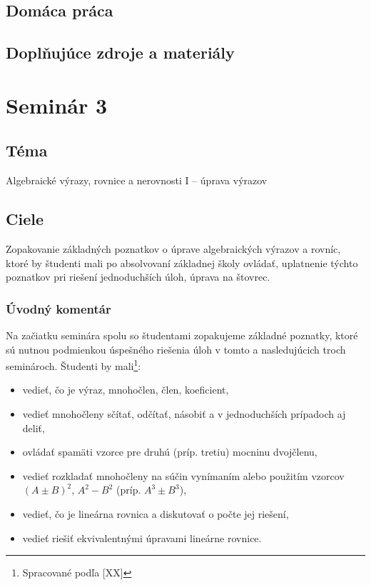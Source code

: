 \documentclass[11pt,a4paper,oneside,final]{book}
\begin{document}
\subsection*{Domáca práca}

\subsection*{Doplňujúce zdroje a materiály}
\newpage
\section*{Seminár 3}
\subsection*{Téma}
Algebraické výrazy, rovnice a nerovnosti I -- úprava výrazov

\subsection*{Ciele}
Zopakovanie základných poznatkov o úprave algebraických výrazov a rovníc, ktoré by študenti mali po absolvovaní základnej školy ovládať, uplatnenie týchto poznatkov pri riešení jednoduchších úloh, úprava na štovrec.

\subsubsection*{Úvodný komentár}
Na začiatku seminára spolu so študentami zopakujeme základné poznatky, ktoré sú nutnou podmienkou úspešného riešenia úloh v tomto a nasledujúcich troch seminároch.
Študenti by mali\footnote{Spracované podľa [XX]}:
\begin{itemize}
\item vedieť, čo je výraz, mnohočlen, člen, koeficient,
\item vedieť mnohočleny sčítať, odčítať, násobiť a v jednoduchších prípadoch aj deliť,
\item ovládať spamäti vzorce pre druhú (príp. tretiu) mocninu dvojčlenu,
\item vedieť rozkladať mnohočleny na súčin vynímaním alebo použitím vzorcov $(A\pm B)^2$, $A^2-B^2$ (príp. $A^3\pm B^3$),
\item vedieť, čo je lineárna rovnica a diskutovať o počte jej riešení,
\item vedieť riešiť ekvivalentnými úpravami lineárne rovnice.\\
\end{itemize}
\end{document}

